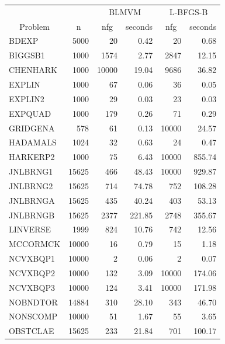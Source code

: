 \begin{table}[bhpt]
\begin{center}
\footnotesize
\begin{tabular}{|lr|rr|rr|}
\hline
\multicolumn{2}{|c|}{} &
\multicolumn{2}{c|}{BLMVM} &
\multicolumn{2}{c|}{L-BFGS-B} \\

\multicolumn{1}{|c}{Problem}&
\multicolumn{1}{c|}{n}&
\multicolumn{1}{c}{nfg}&
\multicolumn{1}{c|}{seconds}&
\multicolumn{1}{c}{nfg} &
\multicolumn{1}{c|}{seconds} \\
\hline
BDEXP &  5000 &  20 & 0.42 &        20 &  0.68  \\ 
BIGGSB1 &  1000 &  1574 & 2.77 &        2847 &  12.15  \\ 
CHENHARK &  1000 &  10000 & 19.04 &        9686 &  36.82  \\ 
EXPLIN &  1000 &  67 & 0.06 &        36 &  0.05  \\ 
EXPLIN2 &  1000 &  29 & 0.03 &        23 &  0.03  \\ 
EXPQUAD &  1000 &  179 & 0.26 &        71 &  0.29  \\ 
GRIDGENA &  578 &  61 & 0.13 &        10000 &  24.57  \\ 
HADAMALS &  1024 &  32 & 0.63 &        24 &  0.47  \\ 
HARKERP2 &  1000 &  75 & 6.43 &        10000 &  855.74  \\ 
JNLBRNG1 &  15625 &  466 & 48.43 &        10000 &  929.87  \\ 
JNLBRNG2 &  15625 &  714 & 74.78 &        752 &  108.28  \\ 
JNLBRNGA &  15625 &  435 & 40.24 &        403 &  53.13  \\ 
JNLBRNGB &  15625 &  2377 & 221.85 &        2748 &  355.67  \\ 
LINVERSE &  1999 &  824 & 10.76 &        742 &  12.56  \\ 
MCCORMCK &  10000 &  16 & 0.79 &        15 &  1.18  \\ 
NCVXBQP1 &  10000 &  2 & 0.06 &        2 &  0.07  \\ 
NCVXBQP2 &  10000 &  132 & 3.09 &        10000 &  174.06  \\ 
NCVXBQP3 &  10000 &  124 & 3.41 &        10000 &  171.98  \\ 
NOBNDTOR &  14884 &  310 & 28.10 &        343 &  46.70  \\ 
NONSCOMP &  10000 &  51 & 1.67 &        55 &  3.65  \\ 
OBSTCLAE &  15625 &  233 & 21.84 &        701 &  100.17  \\ 

\end{tabular}
\end{center}
\end{table}
